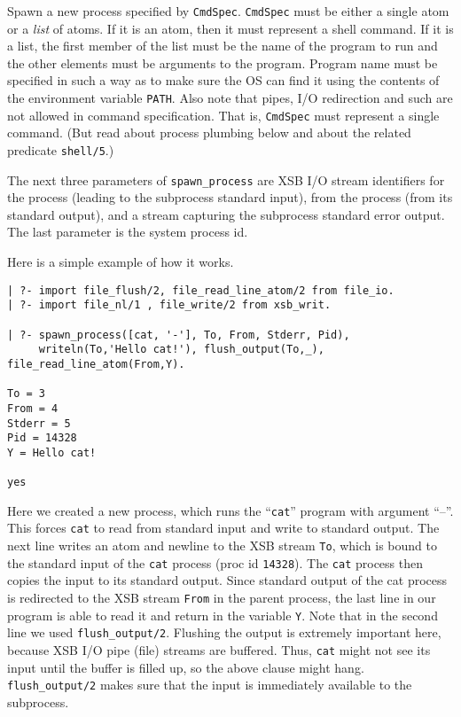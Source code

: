 \begin{description}
Spawn a new process specified by {\tt CmdSpec}. {\tt CmdSpec} must be
either a single atom or a \emph{list} of atoms.
If it is an atom, then it must represent a shell command.
If it is a list, the first member of the list must be the name of the
program to run and the 
other elements must be arguments to the program. Program name must be specified
in such a way as to make sure the OS can find it using the contents of the
environment variable {\tt PATH}.
Also note that pipes, I/O redirection and such are not allowed in command
specification. That is, {\tt CmdSpec} must represent a single command.
(But read about process plumbing below and about the related predicate
{\tt shell/5}.)

The next three parameters of \verb|spawn_process| are XSB I/O stream
identifiers for the process (leading to the subprocess standard
input), from the process (from its standard output), and a stream
capturing the subprocess standard error output. The last parameter is
the system process id.
\end{description}

\noindent
Here is a simple example of how it works.

\begin{verbatim}
| ?- import file_flush/2, file_read_line_atom/2 from file_io.
| ?- import file_nl/1 , file_write/2 from xsb_writ.  

| ?- spawn_process([cat, '-'], To, From, Stderr, Pid),
     writeln(To,'Hello cat!'), flush_output(To,_), file_read_line_atom(From,Y).

To = 3
From = 4
Stderr = 5
Pid = 14328
Y = Hello cat!

yes
\end{verbatim}

Here we created a new process, which runs the ``{\tt cat}'' program
with argument ``--''. This forces {\tt cat} to read from standard
input and write to standard output. The next line writes an atom and
newline to the XSB stream {\tt To}, which is bound to the standard
input of the {\tt cat} process (proc id {\tt 14328}). The {\tt cat}
process then copies the input to its standard output.  Since standard
output of the cat process is redirected to the XSB stream {\tt From}
in the parent process, the last line in our program is able to read it
and return in the variable {\tt Y}.
%
Note that in the second line we used {\tt flush\_output/2}. Flushing
the output is extremely important here, because XSB I/O pipe (file)
streams are buffered.  Thus, {\tt cat} might not see its input until
the buffer is filled up, so the above clause might hang. {\tt
flush\_output/2} makes sure that the input is immediately available to
the subprocess.

